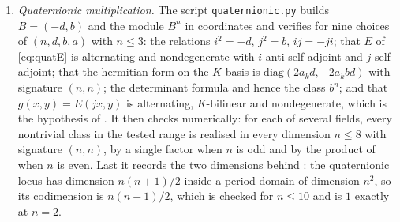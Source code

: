 \begin{enumerate}[label=\textup{(\Roman*)},leftmargin=*]
\item \emph{Quaternionic multiplication.} The script \texttt{quaternionic.py}
  builds $B=(-d,b)$ and the module $B^{n}$ in coordinates and verifies
   for nine choices of $(n,d,b,a)$ with $n\le3$: the
  relations $i^{2}=-d$, $j^{2}=b$, $ij=-ji$; that $E$ of \eqref{eq:quatE} is
  alternating and nondegenerate with $i$ anti-self-adjoint and $j$
  self-adjoint; that the hermitian form on the $K$-basis is
  $\mathrm{diag}(2a_{k}d,-2a_{k}bd)$ with signature $(n,n)$; the determinant
  formula and hence the class $b^{n}$; and that $g(x,y)=E(jx,y)$ is
  alternating, $K$-bilinear and nondegenerate, which is the hypothesis of
  . It then checks  numerically:
  for each of several fields, every nontrivial class in the tested range is
  realised in every dimension $n\le8$ with signature $(n,n)$, by a single
  factor when $n$ is odd and by the product of  when $n$ is
  even. Last it records the two dimensions behind : the
  quaternionic locus has dimension $n(n+1)/2$ inside a period domain of
  dimension $n^{2}$, so its codimension is $n(n-1)/2$, which is checked for
  $n\le10$ and is $1$ exactly at $n=2$.


\end{enumerate}
